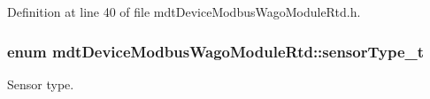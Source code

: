 Definition at line 40 of file mdt\-Device\-Modbus\-Wago\-Module\-Rtd.\-h.

\hypertarget{classmdt_device_modbus_wago_module_rtd_a3ef847ef5be945559be1271e15905fb0}{
\subsubsection[{sensor\-Type\-\_\-t}]{\setlength{\rightskip}{0pt plus 5cm}enum {\bf mdt\-Device\-Modbus\-Wago\-Module\-Rtd\-::sensor\-Type\-\_\-t}}}\label{classmdt_device_modbus_wago_module_rtd_a3ef847ef5be945559be1271e15905fb0}


Sensor type. 

